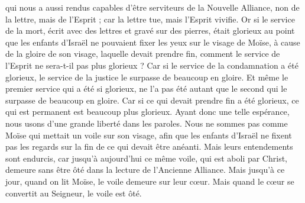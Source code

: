 \begin{multicols}{2}
qui nous a aussi rendus capables d'être serviteurs de la Nouvelle Alliance, non de la lettre, mais de l'Esprit ; car la lettre tue, mais l'Esprit vivifie.
Or si le service de la mort, écrit avec des lettres et gravé sur des pierres, était glorieux au point que les enfants d'Israël ne pouvaient fixer les yeux sur le visage de Moïse, à cause de la gloire de son visage, laquelle devait prendre fin,
comment le service de l'Esprit ne sera-t-il pas plus glorieux ?
Car si le service de la condamnation a été glorieux, le service de la justice le surpasse de beaucoup en gloire.
Et même le premier service qui a été si glorieux, ne l'a pas été autant que le second qui le surpasse de beaucoup en gloire.
Car si ce qui devait prendre fin a été glorieux, ce qui est permanent est beaucoup plus glorieux.
Ayant donc une telle espérance, nous usons d'une grande liberté dans les paroles.
Nous ne sommes pas comme Moïse qui mettait un voile sur son visage, afin que les enfants d'Israël ne fixent pas les regards sur la fin de ce qui devait être anéanti.
Mais leurs entendements sont endurcis, car jusqu'à aujourd'hui ce même voile, qui est aboli par Christ, demeure sans être ôté dans la lecture de l'Ancienne Alliance.
Mais jusqu'à ce jour, quand on lit Moïse, le voile demeure sur leur cœur.
Mais quand le cœur se convertit au Seigneur, le voile est ôté.

\end{multicols}
